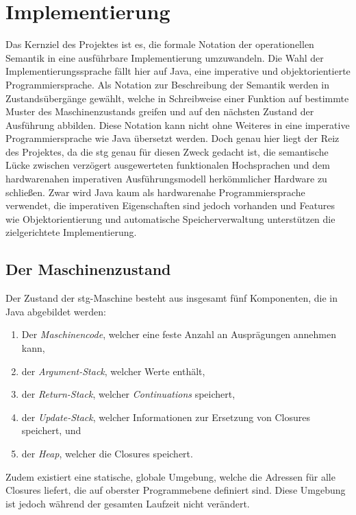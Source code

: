 
\chapter{Implementierung}\label{chap:implementierung}

Das Kernziel des Projektes ist es, die formale Notation der operationellen Semantik in eine ausführbare Implementierung umzuwandeln.
Die Wahl der Implementierungssprache fällt hier auf Java, eine imperative und objektorientierte Programmiersprache.
Als Notation zur Beschreibung der Semantik werden in  Zustandsübergänge gewählt, welche in Schreibweise einer Funktion auf bestimmte Muster des Maschinenzustands greifen und auf den nächsten Zustand der Ausführung abbilden.
Diese Notation kann nicht ohne Weiteres in eine imperative Programmiersprache wie Java übersetzt werden.
Doch genau hier liegt der Reiz des Projektes, da die \gls{stg} genau für diesen Zweck gedacht ist, die semantische Lücke zwischen verzögert ausgewerteten funktionalen Hochsprachen und dem hardwarenahen imperativen Ausführungsmodell herkömmlicher Hardware zu schließen.
Zwar wird Java kaum als hardwarenahe Programmiersprache verwendet, die imperativen Eigenschaften sind jedoch vorhanden und Features wie Objektorientierung und automatische Speicherverwaltung unterstützen die zielgerichtete Implementierung.

\section{Der Maschinenzustand}

Der Zustand der \gls{stg}-Maschine besteht aus insgesamt fünf Komponenten, die in Java abgebildet werden:

\begin{enumerate}
\item Der \textit{Maschinencode}, welcher eine feste Anzahl an Ausprägungen annehmen kann,
\item der \textit{Argument-Stack}, welcher Werte enthält,
\item der \textit{Return-Stack}, welcher \textit{Continuations} speichert,
\item der \textit{Update-Stack}, welcher Informationen zur Ersetzung von Closures speichert, und
\item der \textit{Heap}, welcher die Closures speichert.
\end{enumerate}

Zudem existiert eine statische, globale Umgebung, welche die Adressen für alle Closures liefert, die auf oberster Programmebene definiert sind.
Diese Umgebung ist jedoch während der gesamten Laufzeit nicht verändert.

